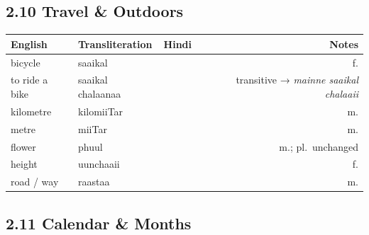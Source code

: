 \subsection{2.10 Travel \& Outdoors}

\begin{tabular}{@{}VTDN@{}}
  \toprule
  English & Transliteration & Hindi & Notes \\
  \midrule
  bicycle          & saaikal       &           & f. \\
  to ride a bike   & saaikal chalaanaa &  & transitive → \textit{mainne saaikal chalaaii} \\
  kilometre        & kilomiiTar    &         & m. \\
  metre            & miiTar        &             & m. \\
  flower           & phuul         &              & m.; pl.\ unchanged \\
  height           & uunchaaii     &            & f. \\
  road / way       & raastaa       &            & m. \\
  \bottomrule
\end{tabular}

\subsection{2.11 Calendar \& Months}

